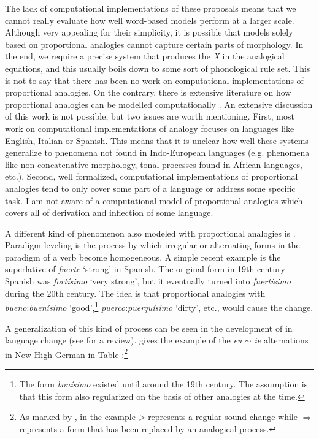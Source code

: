 The lack of computational implementations of these proposals means that we cannot really evaluate how well word-based models perform at a larger scale. Although very appealing for their simplicity, it is possible that models solely based on proportional analogies cannot capture certain parts of morphology. In the end, we require a precise system that produces the \textit{X} in the analogical equations, and this usually boils down to some sort of phonological rule set. This is not to say that there has been no work on computational implementations of proportional analogies. On the contrary, there is extensive literature on how proportional analogies can be modelled computationally \autocites{Federici.1995b, Fertig.2013, Goldsmith.2007, Lepage.1998, Pirrelli.1994a, Pirrelli.1994, Yvon.1997}. An extensive discussion of this work is not possible, but two issues are worth mentioning. First, most work on computational implementations of analogy focuses on languages like English, Italian or Spanish. This means that it is unclear how well these systems generalize to phenomena not found in Indo-European languages (e.g. phenomena like non-concatenative morphology, tonal processes found in African languages, etc.). Second, well formalized, computational implementations of proportional analogies tend to only cover some part of a language or address some specific task. I am not aware of a computational model of proportional analogies which covers all of derivation and inflection of some language.


\largerpage
A different kind of phenomenon also modeled with proportional analogies is . Paradigm leveling is the process by which irregular or alternating forms in the paradigm of a verb become homogeneous. A simple recent example is the superlative of \textit{fuerte} `strong' in Spanish. The original form in 19th century Spanish was \textit{f\emph{o}rtísimo} `very strong', but it eventually turned into \textit{f\emph{ue}rtísimo} during the 20th century. The idea is that proportional analogies with \textit{bueno}:\textit{buenísimo} `good',\footnote{The form \textit{bonísimo} existed until around the 19th century. The assumption is that this form also regularized on the basis of other analogies at the time.} \textit{puerco}:\textit{puerquísimo} `dirty', etc., would cause the change.

A generalization of this kind of process can be seen in the development of  in language change (see \textcite{Albright.2008} for a review). \textcite[144]{Albright.2008} gives the example of the \textit{eu} $\sim$ \textit{ie} alternations in New High German in Table :\footnote{As marked by \textcite[144]{Albright.2008}, in the example \emph{>} represents a regular sound change while $\Rightarrow$ represents a form that has been replaced by an analogical process.}

